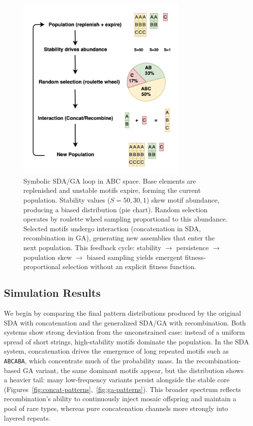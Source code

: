 \documentclass[life,article,submit,pdftex,moreauthors]{Definitions/mdpi}
\begin{document}
\begin{figure}[H]
    \centering
    \includegraphics[width=0.75\textwidth]{SDA-Sym.png}
    \caption{Symbolic SDA/GA loop in ABC space. 
    Base elements are replenished and unstable motifs expire, forming the current population. 
    Stability values ($S=50,30,1$) skew motif abundance, producing a biased distribution (pie chart). 
    Random selection operates by roulette wheel sampling proportional to this abundance. 
    Selected motifs undergo interaction (concatenation in SDA, recombination in GA), 
    generating new assemblies that enter the next population. 
    This feedback cycle: stability $\to$ persistence $\to$ population skew $\to$ biased sampling yields emergent fitness-proportional selection without an explicit fitness function.}
    \label{fig:sda-loop}
\end{figure}


\subsection{Simulation Results}

We begin by comparing the final pattern distributions produced by the original SDA with concatenation and the generalized SDA/GA with recombination. Both systems show strong deviation from the unconstrained case: instead of a uniform spread of short strings, high-stability motifs dominate the population. In the SDA system, concatenation drives the emergence of long repeated motifs such as \texttt{ABCABA}, which concentrate much of the probability mass. In the recombination-based GA variant, the same dominant motifs appear, but the distribution shows a heavier tail: many low-frequency variants persist alongside the stable core (Figures~\ref{fig:concat-patterns},~\ref{fig:ga-patterns}). This broader spectrum reflects recombination’s ability to continuously inject mosaic offspring and maintain a pool of rare types, whereas pure concatenation channels more strongly into layered repeats.
\end{document}
